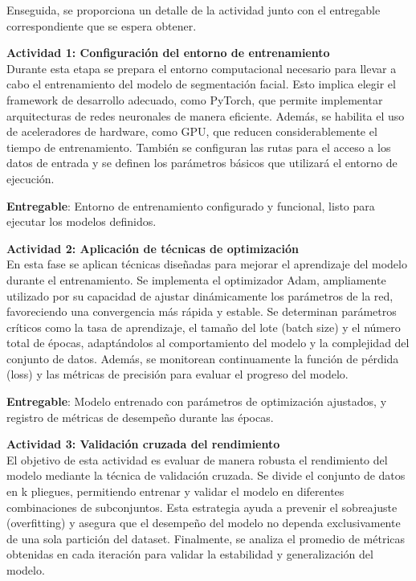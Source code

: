  Enseguida, se proporciona un detalle de la actividad junto con el entregable correspondiente que se espera obtener.
 
 \textbf{Actividad 1: Configuración del entorno de entrenamiento}
 \\
 Durante esta etapa se prepara el entorno computacional necesario para llevar a cabo el entrenamiento del modelo de segmentación facial. Esto implica elegir el framework de desarrollo adecuado, como PyTorch, que permite implementar arquitecturas de redes neuronales de manera eficiente. Además, se habilita el uso de aceleradores de hardware, como GPU, que reducen considerablemente el tiempo de entrenamiento. También se configuran las rutas para el acceso a los datos de entrada y se definen los parámetros básicos que utilizará el entorno de ejecución.

 \textbf{Entregable}: Entorno de entrenamiento configurado y funcional, listo para ejecutar los modelos definidos.

 \textbf{Actividad 2: Aplicación de técnicas de optimización}
 \\
 En esta fase se aplican técnicas diseñadas para mejorar el aprendizaje del modelo durante el entrenamiento. Se implementa el optimizador Adam, ampliamente utilizado por su capacidad de ajustar dinámicamente los parámetros de la red, favoreciendo una convergencia más rápida y estable. Se determinan parámetros críticos como la tasa de aprendizaje, el tamaño del lote (batch size) y el número total de épocas, adaptándolos al comportamiento del modelo y la complejidad del conjunto de datos. Además, se monitorean continuamente la función de pérdida (loss) y las métricas de precisión para evaluar el progreso del modelo.

 \textbf{Entregable}: Modelo entrenado con parámetros de optimización ajustados, y registro de métricas de desempeño durante las épocas.

 \textbf{Actividad 3: Validación cruzada del rendimiento}
 \\
 El objetivo de esta actividad es evaluar de manera robusta el rendimiento del modelo mediante la técnica de validación cruzada. Se divide el conjunto de datos en k pliegues, permitiendo entrenar y validar el modelo en diferentes combinaciones de subconjuntos. Esta estrategia ayuda a prevenir el sobreajuste (overfitting) y asegura que el desempeño del modelo no dependa exclusivamente de una sola partición del dataset. Finalmente, se analiza el promedio de métricas obtenidas en cada iteración para validar la estabilidad y generalización del modelo.

